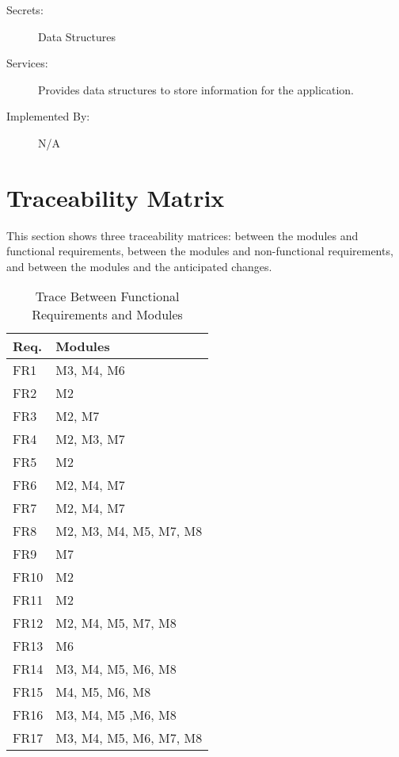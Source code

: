 \documentclass[12pt, titlepage]{article}
\begin{document}
\begin{description}
\item[Secrets:] Data Structures
\item[Services:] Provides data structures to store information for the application.
\item[Implemented By:] N/A
\end{description}


\section{Traceability Matrix} \label{SecTM}

This section shows three traceability matrices: between the modules and functional requirements, between the modules and non-functional requirements, and between the modules and the anticipated changes.

\begin{table}[H]
\centering
\begin{tabular}{p{} p{}}
\toprule
\textbf{Req.} & \textbf{Modules}\\
\midrule
FR1 & M3, M4, M6 \\
FR2 & M2\\
FR3 & M2, M7\\
FR4 & M2, M3, M7\\
FR5 & M2\\
FR6 & M2, M4, M7\\
FR7 & M2, M4, M7\\
FR8 & M2, M3, M4, M5, M7, M8\\
FR9 & M7\\
FR10 & M2\\
FR11 & M2\\
FR12 & M2, M4, M5, M7, M8\\
FR13 & M6\\
FR14 & M3, M4, M5, M6, M8\\
FR15 & M4, M5, M6, M8\\
FR16 & M3, M4, M5 ,M6, M8\\
FR17 & M3, M4, M5, M6, M7, M8\\
\bottomrule
\end{tabular}
\caption{Trace Between Functional Requirements and Modules}
\label{TblRT}
\end{table}
\end{document}
